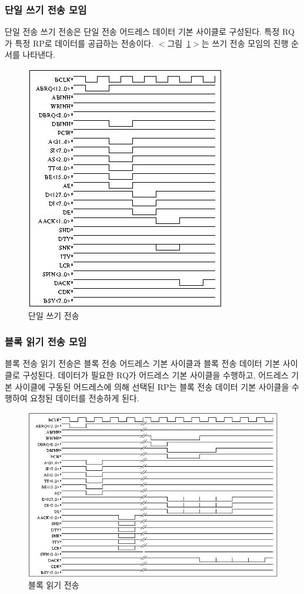 \subsubsection{단일 쓰기 전송 모임}
단일 전송 쓰기 전송은 단일 전송 어드레스 데이터 기본 사이클로 구성된다.
특정 RQ가 특정 RP로 데이터를 공급하는 전송이다.
$<$그림~\ref{figure:single-write}$>$는 쓰기 전송 모임의 진행 순서를 나타낸다.
\begin{figure}[hp]
   \centerline{\includegraphics{ch3/FIG/single-write.jpg}}
   \caption{단일 쓰기 전송}\label{figure:single-write}
\end{figure}
%
\subsubsection{블록 읽기 전송 모임}
블록 전송 읽기 전송은 블록 전송 어드레스 기본 사이클과 블록 전송 데이터 기본 사이클로 구성된다.
데이터가 필요한 RQ가 어드레스 기본 사이클을 수행하고, 어드레스 기본 사이클에 구동된 어드레스에 의해
선택된 RP는 블록 전송 데이터 기본 사이클을 수행하여 요청된 데이터를 전송하게 된다.
\begin{figure}[hp]
   \centerline{\includegraphics[angle=90]{ch3/FIG/block-read.jpg}}
   \caption{블록 읽기 전송}\label{figure:block-read}
\end{figure}
%
